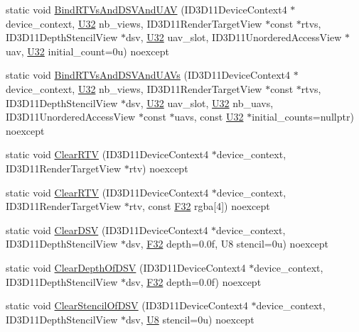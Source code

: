 \begin{DoxyCompactItemize}
\item 
static void \hyperlink{structmage_1_1_pipeline_1_1_o_m_a26a0c8503c2b697dad4d7d8695a41277}{Bind\+R\+T\+Vs\+And\+D\+S\+V\+And\+U\+AV} (I\+D3\+D11\+Device\+Context4 $\ast$device\+\_\+context, \hyperlink{namespacemage_a41c104c036fba3756a74e19f793eeaa1}{U32} nb\+\_\+views, I\+D3\+D11\+Render\+Target\+View $\ast$const $\ast$rtvs, I\+D3\+D11\+Depth\+Stencil\+View $\ast$dsv, \hyperlink{namespacemage_a41c104c036fba3756a74e19f793eeaa1}{U32} uav\+\_\+slot, I\+D3\+D11\+Unordered\+Access\+View $\ast$uav, \hyperlink{namespacemage_a41c104c036fba3756a74e19f793eeaa1}{U32} initial\+\_\+count=0u) noexcept
\item 
static void \hyperlink{structmage_1_1_pipeline_1_1_o_m_a6d5cb6a6e7cefd3c02053933e6c3bfb6}{Bind\+R\+T\+Vs\+And\+D\+S\+V\+And\+U\+A\+Vs} (I\+D3\+D11\+Device\+Context4 $\ast$device\+\_\+context, \hyperlink{namespacemage_a41c104c036fba3756a74e19f793eeaa1}{U32} nb\+\_\+views, I\+D3\+D11\+Render\+Target\+View $\ast$const $\ast$rtvs, I\+D3\+D11\+Depth\+Stencil\+View $\ast$dsv, \hyperlink{namespacemage_a41c104c036fba3756a74e19f793eeaa1}{U32} uav\+\_\+slot, \hyperlink{namespacemage_a41c104c036fba3756a74e19f793eeaa1}{U32} nb\+\_\+uavs, I\+D3\+D11\+Unordered\+Access\+View $\ast$const $\ast$uavs, const \hyperlink{namespacemage_a41c104c036fba3756a74e19f793eeaa1}{U32} $\ast$initial\+\_\+counts=nullptr) noexcept
\item 
static void \hyperlink{structmage_1_1_pipeline_1_1_o_m_aa2383d1a29a34cacbc9fd96f97af31f7}{Clear\+R\+TV} (I\+D3\+D11\+Device\+Context4 $\ast$device\+\_\+context, I\+D3\+D11\+Render\+Target\+View $\ast$rtv) noexcept
\item 
static void \hyperlink{structmage_1_1_pipeline_1_1_o_m_af93a2f44917e3637fcbc471bfe58b401}{Clear\+R\+TV} (I\+D3\+D11\+Device\+Context4 $\ast$device\+\_\+context, I\+D3\+D11\+Render\+Target\+View $\ast$rtv, const \hyperlink{namespacemage_aa97e833b45f06d60a0a9c4fc22ae02c0}{F32} rgba\mbox{[}4\mbox{]}) noexcept
\item 
static void \hyperlink{structmage_1_1_pipeline_1_1_o_m_a17b8f27631e5513b31b7294b93a0823a}{Clear\+D\+SV} (I\+D3\+D11\+Device\+Context4 $\ast$device\+\_\+context, I\+D3\+D11\+Depth\+Stencil\+View $\ast$dsv, \hyperlink{namespacemage_aa97e833b45f06d60a0a9c4fc22ae02c0}{F32} depth=0.\+0f, U8 stencil=0u) noexcept
\item 
static void \hyperlink{structmage_1_1_pipeline_1_1_o_m_a682ce6380807218da4042475e983b6d7}{Clear\+Depth\+Of\+D\+SV} (I\+D3\+D11\+Device\+Context4 $\ast$device\+\_\+context, I\+D3\+D11\+Depth\+Stencil\+View $\ast$dsv, \hyperlink{namespacemage_aa97e833b45f06d60a0a9c4fc22ae02c0}{F32} depth=0.\+0f) noexcept
\item 
static void \hyperlink{structmage_1_1_pipeline_1_1_o_m_a06e1bfe546294e8d3f68de673124d8a4}{Clear\+Stencil\+Of\+D\+SV} (I\+D3\+D11\+Device\+Context4 $\ast$device\+\_\+context, I\+D3\+D11\+Depth\+Stencil\+View $\ast$dsv, \hyperlink{namespacemage_afc638980bc6154f15af5e2d93a0e0ea9}{U8} stencil=0u) noexcept
\end{DoxyCompactItemize}
